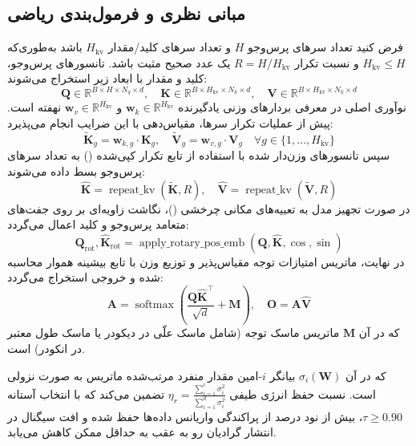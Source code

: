 \subsection{مبانی نظری و فرمول‌بندی ریاضی}
فرض کنید تعداد سرهای پرس‌وجو $H$ و تعداد سرهای کلید/مقدار $H_{\text{kv}}$ باشد به‌طوری‌که $H_{\text{kv}} \le H$ و نسبت تکرار $R = H / H_{\text{kv}}$ یک عدد صحیح مثبت باشد. تانسورهای پرس‌وجو، کلید و مقدار با ابعاد زیر استخراج می‌شوند:
\begin{equation}
\mathbf{Q} \in \mathbb{R}^{B \times H \times N_q \times d}, \quad \mathbf{K} \in \mathbb{R}^{B \times H_{\text{kv}} \times N_k \times d}, \quad \mathbf{V} \in \mathbb{R}^{B \times H_{\text{kv}} \times N_k \times d}
\end{equation}
نوآوری اصلی  در معرفی بردارهای وزنی یادگیرنده $\mathbf{w}_k \in \mathbb{R}^{H_{\text{kv}}}$ و $\mathbf{w}_v \in \mathbb{R}^{H_{\text{kv}}}$ نهفته است. پیش از عملیات تکرار سرها، مقیاس‌دهی با این ضرایب انجام می‌پذیرد:
\begin{equation}
\tilde{\mathbf{K}}_g = \mathbf{w}_{k, g} \cdot \mathbf{K}_g, \quad \tilde{\mathbf{V}}_g = \mathbf{w}_{v, g} \cdot \mathbf{V}_g \quad \forall g \in \{1, \dots, H_{\text{kv}}\}
\end{equation}
سپس تانسورهای وزن‌دار شده با استفاده از تابع تکرار کپی‌شده () به تعداد سرهای پرس‌وجو بسط داده می‌شوند:
\begin{equation}
\hat{\mathbf{K}} = \operatorname{repeat\_kv}(\tilde{\mathbf{K}}, R), \quad \hat{\mathbf{V}} = \operatorname{repeat\_kv}(\tilde{\mathbf{V}}, R)
\end{equation}
در صورت تجهیز مدل به تعبیه‌های مکانی چرخشی ()، نگاشت زاویه‌ای بر روی جفت‌های متعامد پرس‌وجو و کلید اعمال می‌گردد:
\begin{equation}
\mathbf{Q}_{\text{rot}}, \hat{\mathbf{K}}_{\text{rot}} = \operatorname{apply\_rotary\_pos\_emb}(\mathbf{Q}, \hat{\mathbf{K}}, \cos, \sin)
\end{equation}
در نهایت، ماتریس امتیازات توجه مقیاس‌پذیر و توزیع وزن با تابع بیشینه هموار محاسبه شده و خروجی استخراج می‌گردد:
\begin{equation}
\mathbf{A} = \operatorname{softmax}\left(\frac{\mathbf{Q} \hat{\mathbf{K}}^\top}{\sqrt{d}} + \mathbf{M}\right), \quad \mathbf{O} = \mathbf{A} \hat{\mathbf{V}}
\end{equation}
که در آن $\mathbf{M}$ ماتریس ماسک توجه (شامل ماسک علّی در دیکودر یا ماسک طول معتبر در انکودر) است.

که در آن $\sigma_i(\mathbf{W})$ بیانگر $i$-امین مقدار منفرد مرتب‌شده ماتریس به صورت نزولی است. نسبت حفظ انرژی طیفی $\eta_r = \frac{\sum_{i=1}^r \sigma_i^2}{\sum_{i=1}^{d} \sigma_i^2}$ تضمین می‌کند که با انتخاب آستانه $\tau \ge 0.90$، بیش از نود درصد از پراکندگی واریانس داده‌ها حفظ شده و افت سیگنال در انتشار گرادیان رو به عقب به حداقل ممکن کاهش می‌یابد.

